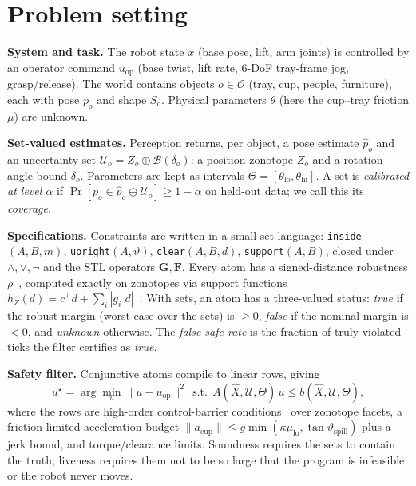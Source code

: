 \documentclass[10pt,twocolumn,letterpaper]{article}
\begin{document}
\section{Problem setting}\label{sec:setting}
\textbf{System and task.} The robot state $x$ (base pose, lift, arm joints) is controlled by an operator command $u_{\mathrm{op}}$ (base
twist, lift rate, 6-DoF tray-frame jog, grasp/release). The world contains objects $o\in\mathcal{O}$ (tray, cup, people, furniture), each
with pose $p_o$ and shape $S_o$. Physical parameters $\theta$ (here the cup--tray friction $\mu$) are unknown.

\textbf{Set-valued estimates.} Perception returns, per object, a pose estimate $\hat p_o$ and an uncertainty set
$\mathcal{U}_o=Z_o\oplus\mathcal{B}(\delta_o)$: a position zonotope $Z_o$ and a rotation-angle bound $\delta_o$. Parameters are kept as
intervals $\Theta=[\theta_{\mathrm{lo}},\theta_{\mathrm{hi}}]$. A set is \emph{calibrated at level $\alpha$} if
$\Pr[p_o\in\hat p_o\oplus\mathcal{U}_o]\ge1-\alpha$ on held-out data; we call this its \emph{coverage}.

\textbf{Specifications.} Constraints are written in a small set language: \texttt{inside}$(A,B,m)$, \texttt{upright}$(A,\vartheta)$,
\texttt{clear}$(A,B,d)$, \texttt{support}$(A,B)$, closed under $\wedge,\vee,\neg$ and the STL operators $\mathbf{G},\mathbf{F}$. Every atom has
a signed-distance robustness $\rho$~\cite{donze2010}, computed exactly on zonotopes via support functions
$h_Z(d)=c^\top d+\sum_i|g_i^\top d|$~\cite{girard2005,althoff2015}. With sets, an atom has a three-valued status:
\emph{true} if the robust margin (worst case over the sets) is $\ge0$, \emph{false} if the nominal margin is $<0$, and \emph{unknown} otherwise.
The \emph{false-safe rate} is the fraction of truly violated ticks the filter certifies as \emph{true}.

\textbf{Safety filter.} Conjunctive atoms compile to linear rows, giving
\begin{equation}
u^\star=\arg\min_u \|u-u_{\mathrm{op}}\|^2 \ \ \text{s.t.}\ \ A(\hat X,\mathcal{U},\Theta)\,u\le b(\hat X,\mathcal{U},\Theta),
\end{equation}
where the rows are high-order control-barrier conditions~\cite{ames2019} over zonotope facets, a friction-limited acceleration budget
$\|a_{\mathrm{cup}}\|\le g\min(\kappa\mu_{\mathrm{lo}},\tan\vartheta_{\mathrm{spill}})$ plus a jerk bound, and torque/clearance limits.
Soundness requires the sets to contain the truth; liveness requires them not to be so large that the program is infeasible or the robot
never moves.
\end{document}
